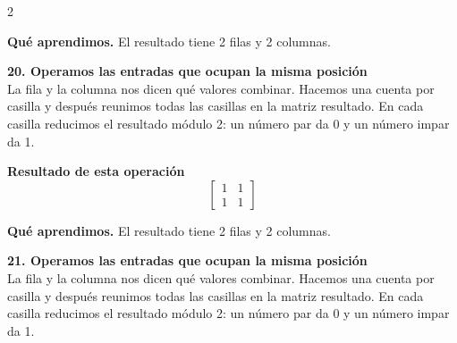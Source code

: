 \documentclass[11pt,a4paper,landscape]{article}
\begin{document}
\begin{multicols*}{2}
\begin{minipage}{\linewidth}
\par\smallskip\textbf{Qué aprendimos.} El resultado tiene 2 filas y 2 columnas.
\end{minipage}\par\medskip
\noindent\begin{minipage}{\linewidth}\textbf{20. Operamos las entradas que ocupan la misma posición}\\[2pt]La fila y la columna nos dicen qué valores combinar. Hacemos una cuenta por casilla y después reunimos todas las casillas en la matriz resultado. En cada casilla reducimos el resultado módulo 2: un número par da 0 y un número impar da 1.
\par{}\par\smallskip
\par\smallskip \textbf{Resultado de esta operación}\[\begin{bmatrix}1 & 1\\1 & 1\end{bmatrix}\]
\par\smallskip\textbf{Qué aprendimos.} El resultado tiene 2 filas y 2 columnas.
\end{minipage}\par\medskip
\noindent\begin{minipage}{\linewidth}\textbf{21. Operamos las entradas que ocupan la misma posición}\\[2pt]La fila y la columna nos dicen qué valores combinar. Hacemos una cuenta por casilla y después reunimos todas las casillas en la matriz resultado. En cada casilla reducimos el resultado módulo 2: un número par da 0 y un número impar da 1.

\end{minipage}
\end{multicols*}
\end{document}
